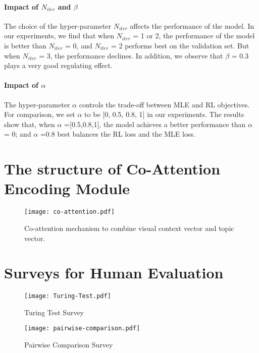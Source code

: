 \documentclass[11pt]{article}
\begin{document}
\paragraph{Impact of $N_{iter}$ and $\beta$} The choice of the hyper-parameter $N_{iter}$ affects the performance of the model. In our experiments, we find that when $N_{iter}$ = 1 or 2, the performance of the model is better than $N_{iter}$ = 0, and $N_{iter}$ = 2 performs best on the validation set. But when $N_{iter}$ = 3, the performance declines. In addition, we observe that $\beta$ = 0.3 plays a very good regulating effect.

\paragraph{Impact of $\alpha$}
The hyper-parameter $\alpha$ controls the trade-off between MLE and RL objectives. For comparison, we set $\alpha$ to be [0, 0.5, 0.8, 1] in our experiments. The results show that, when $\alpha$ =[0.5,0.8,1], the model achieves a better performance than $\alpha$ = 0; and $\alpha$ =0.8 best balances the RL loss and the MLE loss. 

\section{The structure of Co-Attention Encoding Module}

\begin{figure}[h]
\begin{center}
\texttt{[image: co-attention.pdf]}  
\end{center}
  \caption{Co-attention mechanism to combine visual context vector and topic vector.}
  \label{fig:co-attention}
\end{figure}

\section{Surveys for Human Evaluation}

\begin{figure}
	\centering
	\texttt{[image: Turing-Test.pdf]} 
	\caption{Turing Test Survey}
	\label{fig:turing-test}
\end{figure}

\begin{figure}
	\centering
	\texttt{[image: pairwise-comparison.pdf]} 
	\caption{Pairwise Comparison Survey}
	\label{fig:pairwise-comparison}
\end{figure}
\end{document}
